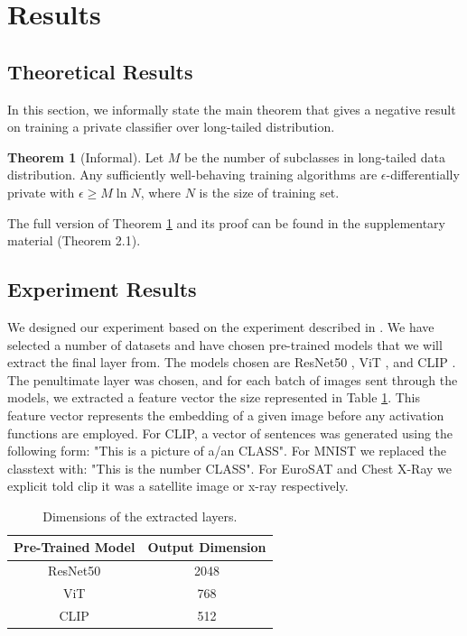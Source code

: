 \documentclass{article}
\theoremstyle{definition}
\newtheorem{theorem}{Theorem}[section]
\begin{document}
\section{Results}
\subsection{Theoretical Results}
\label{subsec:theory}
In this section, we informally state the main theorem that gives a negative result on training a private classifier over long-tailed distribution.
\begin{theorem}[Informal]
    Let $M$ be the number of subclasses in long-tailed data distribution. Any sufficiently well-behaving training algorithms are $\epsilon$-differentially private with $\epsilon \geq M\ln N$, where $N$  is the size of training set.
    \label{thm:main}
\end{theorem}
The full version of Theorem \ref{thm:main} and its proof can be found in the supplementary material (Theorem 2.1).

\subsection{Experiment Results}
\label{subsec:exp}

We designed our experiment based on the experiment described in \citet{tramer2020differentially}. We have selected a number of datasets and have chosen pre-trained models that we will extract the final layer from. The models chosen are ResNet50 \cite{he2016deep}, ViT \cite{dosovitskiy2020image}, and CLIP \cite{radford2021learning}. The penultimate layer was chosen, and for each batch of images sent through the models, we extracted a feature vector the size represented in Table \ref{tab:embedded_dims}. This feature vector represents the embedding of a given image before any activation functions are employed. For CLIP, a vector of sentences was generated using the following form: "This is a picture of a/an CLASS". For MNIST we replaced the classtext with: "This is the number CLASS". For EuroSAT and Chest X-Ray we explicit told clip it was a satellite image or x-ray respectively.

\begin{table}[h]
    \centering
    \begin{tabular}{c|c}
        Pre-Trained Model & Output Dimension \\
        \toprule
        ResNet50 &  2048 \\
        ViT & 768 \\
        CLIP & 512\\
    \end{tabular}
    \caption{Dimensions of the extracted layers.}
    \label{tab:embedded_dims}
\end{table}
\end{document}

